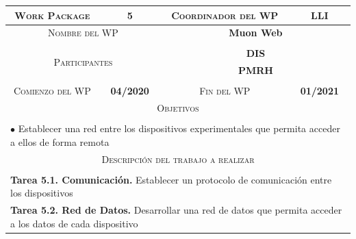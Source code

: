 \documentclass[11pt]{extarticle}
\begin{document}
				\begin{table}[H]
					\centering
					\begin{tabular}{|c|c|c|c|}
						\hline
						\textsc{Work Package} & 5 & \textsc{Coordinador del WP} & \textbf{LLI} \\ \hline
						
						\multicolumn{2}{|c|}{\textsc{Nombre del WP}} & \multicolumn{2}{c|}{\textbf{Muon Web}} \\ \hline
						\multicolumn{2}{|c|}{\multirow{4}{*}{\textsc{Participantes}}} & \multicolumn{2}{c|}{\textbf{}} \\ 
						\multicolumn{2}{|c|}{}& \multicolumn{2}{c|}{\textbf{DIS}}\\
						\multicolumn{2}{|c|}{}& \multicolumn{2}{c|}{\textbf{PMRH}}\\
						\multicolumn{2}{|c|}{}& \multicolumn{2}{c|}{\textbf{}}\\ \hline
						\textsc{Comienzo del WP} & \textbf{04/2020} & \textsc{Fin del WP} & \textbf{01/2021} \\ \hline
						\multicolumn{4}{|c|}{\textsc{Objetivos}} \\
						\multicolumn{4}{|c|}{\vspace{-0.7cm}} \\
						\multicolumn{4}{|l|}{\multirow{3}{\linewidth}{$\bullet$  Establecer una red entre los dispositivos experimentales que permita acceder a ellos de forma remota}} \\
						\multicolumn{4}{|l|}{}\\
						\multicolumn{4}{|l|}{}\\ \hline
						\multicolumn{4}{|c|}{\textsc{Descripción del trabajo a realizar}} \\
						\multicolumn{4}{|c|}{\vspace{-0.7cm}} \\
						\multicolumn{4}{|l|}{\multirow{3}{\linewidth}{\textbf{Tarea 5.1. Comunicación.} Establecer un protocolo de comunicación entre los dispositivos}} \\ 
						\multicolumn{4}{|l|}{}\\
						\multicolumn{4}{|l|}{}\\
						\multicolumn{4}{|l|}{\multirow{3}{\linewidth}{\textbf{Tarea 5.2. Red de Datos.} Desarrollar una red de datos que permita acceder a los datos de cada dispositivo}} \\ 
						\multicolumn{4}{|l|}{}\\

\end{tabular}
\end{table}
\end{document}
